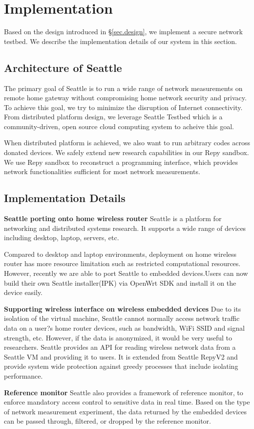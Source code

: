 \section{Implementation}
\label{sec.implementation}

Based on the design introduced in \S{\ref{sec.design}}, we implement a secure network testbed. We describe the implementation details of our system in this section.

\subsection{Architecture of Seattle}
The primary goal of Seattle is to run a wide range of network measurements on remote home gateway without compromising home network security and privacy. To achieve this goal, we try to minimize the disruption of Internet connectivity. From distributed platform design, we leverage Seattle Testbed which is a community-driven, open source cloud computing system to acheive this goal. 

When distributed platform is achieved, we also want to run arbitrary codes across donated devices. We safely extend new research capabilities in our Repy sandbox. We use Repy sandbox to reconstruct a programming interface, which provides network functionalities sufficient for most network measurements.

\subsection{Implementation Details}
\textbf{Seattle porting onto home wireless router} 
Seattle is a platform for networking and distributed systems research. It supports a wide range of devices including desktop, laptop, servers, etc.

Compared to desktop and laptop environments, deployment on home wireless router has more resource limitation such as restricted computational resources. However, recently we are able to port Seattle to embedded devices.Users can now build their own Seattle installer(IPK) via OpenWrt SDK and install it on the device easily. 

\textbf{Supporting wireless interface on wireless embedded devices} 
Due to its isolation of the virtual machine, Seattle cannot normally access network traffic data on a user?s home router devices, such as bandwidth, WiFi SSID and signal strength, etc. However, if the data is anonymized, it would be very useful to researchers. Seattle provides an API for reading wireless network data from a Seattle VM and providing it to users. It is extended from Seattle RepyV2 and provide system wide protection against greedy processes that include isolating performance. 

\textbf{Reference monitor}
Seattle also provides a framework of reference monitor, to enforce mandatory access control to sensitive data in real time. Based on the type of network measurement experiment, the data returned by the embedded devices can be passed through, filtered, or dropped by the reference monitor.
